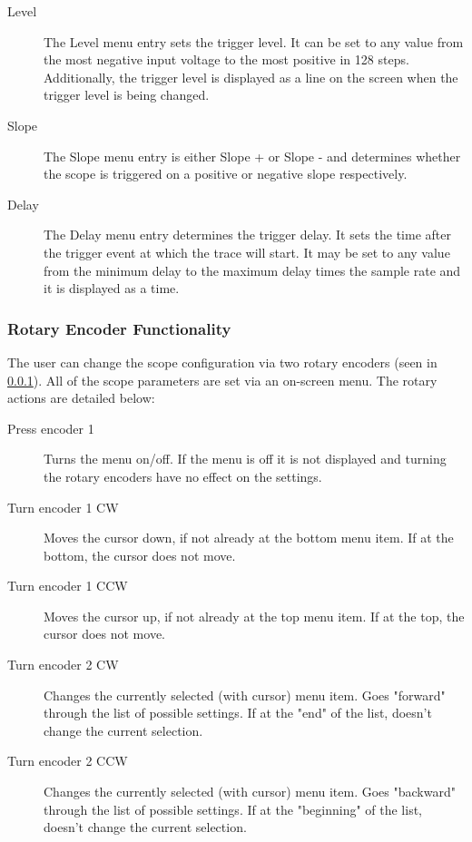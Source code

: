 \documentclass[12pt]{refart} %
\begin{document}
\begin{description}
	\item[Level] The Level menu entry sets the trigger level. It can be set to any value from the most negative input voltage to the most positive in 128 steps. Additionally, the trigger level is displayed as a line on the screen when the trigger level is being changed.
	
	\item[Slope] The Slope menu entry is either Slope + or Slope - and determines whether the scope is triggered on a positive or negative slope respectively.
	
	\item[Delay] The Delay menu entry determines the trigger delay. It sets the time after the trigger event at which the trace will start. It may be set to any value from the minimum delay to the maximum delay times the sample rate and it is displayed as a time.
\end{description}

\subsubsection{Rotary Encoder Functionality}  \label{subsubsec:RotaryEncoderFunctionality}
The user can change the scope configuration via two rotary encoders (seen in \ref{}). All of the scope parameters are set via an on-screen menu. The rotary actions are detailed below: 
\begin{description}
	\item[Press encoder 1] Turns the menu on/off. If the menu is off it is not displayed and turning the rotary encoders have no effect on the settings.
	
	\item[Turn encoder 1 CW] Moves the cursor down, if not already at the bottom menu item. If at the bottom, the cursor does not move. 
	
	\item[Turn encoder 1 CCW] Moves the cursor up, if not already at the top menu item. If at the top, the cursor does not move.
	
	\item[Turn encoder 2 CW] Changes the currently selected (with cursor) menu item. Goes "forward" through the list of possible settings. If at the "end" of the list, doesn't change the current selection.
	
	\item[Turn encoder 2 CCW] Changes the currently selected (with cursor) menu item. Goes "backward" through the list of possible settings. If at the "beginning" of the list, doesn't change the current selection.
\end{description}
\end{document}
